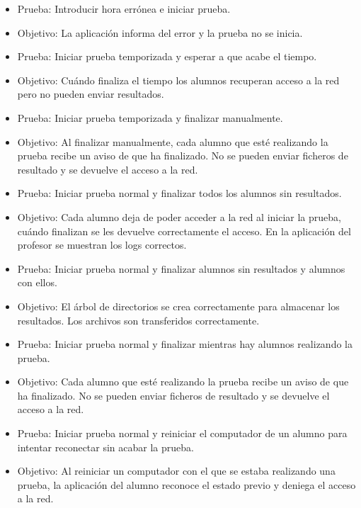 \begin{itemize}
    \item Prueba: Introducir hora errónea e iniciar prueba.
    \item Objetivo: La aplicación informa del error y la prueba no se inicia.
    \newline

    \item Prueba: Iniciar prueba temporizada y esperar a que acabe el tiempo.
    \item Objetivo: Cuándo finaliza el tiempo los alumnos recuperan acceso a la red pero no pueden enviar resultados.
    \newline

    \item Prueba: Iniciar prueba temporizada y finalizar manualmente.
    \item Objetivo: Al finalizar manualmente, cada alumno que esté realizando la prueba recibe un aviso de que ha finalizado. No se pueden enviar ficheros de resultado y se devuelve el acceso a la red.
    \newline


    \item Prueba: Iniciar prueba normal y finalizar todos los alumnos sin resultados.
    \item Objetivo: Cada alumno deja de poder acceder a la red al iniciar la prueba, cuándo finalizan se les devuelve correctamente el acceso. En la aplicación del profesor se muestran los logs correctos.
    \newline

    \item Prueba: Iniciar prueba normal y finalizar alumnos sin resultados y alumnos con ellos.
    \item Objetivo: El árbol de directorios se crea correctamente para almacenar los resultados. Los archivos son transferidos correctamente.
    \newline

    \item Prueba: Iniciar prueba normal y finalizar mientras hay alumnos realizando la prueba.
    \item Objetivo: Cada alumno que esté realizando la prueba recibe un aviso de que ha finalizado. No se pueden enviar ficheros de resultado y se devuelve el acceso a la red.
    \newline


    \item Prueba: Iniciar prueba normal y reiniciar el computador de un alumno para intentar reconectar sin acabar la prueba.
    \item Objetivo: Al reiniciar un computador con el que se estaba realizando una prueba, la aplicación del alumno reconoce el estado previo y deniega el acceso a la red.
    \newline


\end{itemize}
